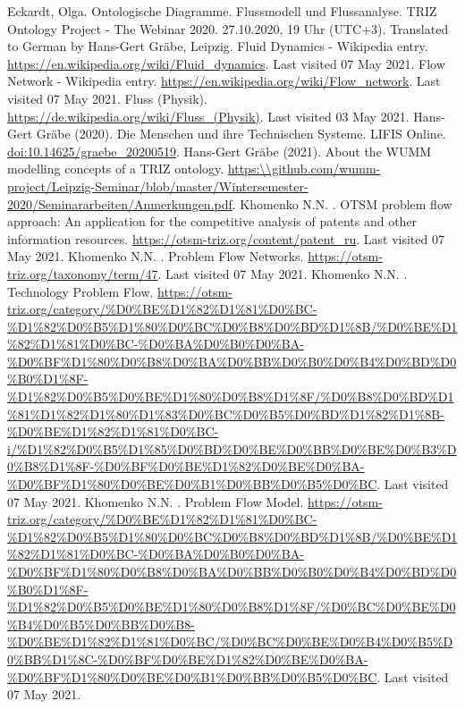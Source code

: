 \documentclass[a4paper,11pt]{article}
\begin{document}
\begin{itemize}
\begin{thebibliography}{...}
    \raggedright
     Eckardt, Olga. Ontologische Diagramme. Flussmodell und Flussanalyse. TRIZ Ontology Project - The Webinar 2020. 27.10.2020, 19 Uhr (UTC+3). Translated to German by Hans-Gert Gräbe, Leipzig. 
     Fluid Dynamics - Wikipedia entry.
        \url{https://en.wikipedia.org/wiki/Fluid_dynamics}. Last visited 07 May 2021.
     Flow Network - Wikipedia entry.
        \url{https://en.wikipedia.org/wiki/Flow_network}. Last visited 07 May 2021.
     Fluss (Physik).
        \url{https://de.wikipedia.org/wiki/Fluss_(Physik)}. Last visited 03 May 2021.
     Hans-Gert Gr\"abe (2020).  Die Menschen und ihre Technischen Systeme. LIFIS Online.
        \url{doi:10.14625/graebe_20200519}.
     Hans-Gert Gr\"abe (2021). About the WUMM modelling concepts of a TRIZ ontology.
        \url{https:\\github.com/wumm-project/Leipzig-Seminar/blob/master/Wintersemester-2020/Seminararbeiten/Anmerkungen.pdf}.
     Khomenko N.N. . OTSM problem flow approach: An application for the competitive analysis of patents and other information resources.
        \url{https://otsm-triz.org/content/patent_ru}. Last visited 07 May 2021.
     Khomenko N.N. . Problem Flow Networks.
        \url{https://otsm-triz.org/taxonomy/term/47}. Last visited 07 May 2021.
     Khomenko N.N. . Technology Problem Flow.
        \url{https://otsm-triz.org/category/%D0%BE%D1%82%D1%81%D0%BC-%D1%82%D0%B5%D1%80%D0%BC%D0%B8%D0%BD%D1%8B/%D0%BE%D1%82%D1%81%D0%BC-%D0%BA%D0%B0%D0%BA-%D0%BF%D1%80%D0%B8%D0%BA%D0%BB%D0%B0%D0%B4%D0%BD%D0%B0%D1%8F-%D1%82%D0%B5%D0%BE%D1%80%D0%B8%D1%8F/%D0%B8%D0%BD%D1%81%D1%82%D1%80%D1%83%D0%BC%D0%B5%D0%BD%D1%82%D1%8B-%D0%BE%D1%82%D1%81%D0%BC-i/%D1%82%D0%B5%D1%85%D0%BD%D0%BE%D0%BB%D0%BE%D0%B3%D0%B8%D1%8F-%D0%BF%D0%BE%D1%82%D0%BE%D0%BA-%D0%BF%D1%80%D0%BE%D0%B1%D0%BB%D0%B5%D0%BC}. Last visited 07 May 2021.
     Khomenko N.N. . Problem Flow Model.
        \url{https://otsm-triz.org/category/%D0%BE%D1%82%D1%81%D0%BC-%D1%82%D0%B5%D1%80%D0%BC%D0%B8%D0%BD%D1%8B/%D0%BE%D1%82%D1%81%D0%BC-%D0%BA%D0%B0%D0%BA-%D0%BF%D1%80%D0%B8%D0%BA%D0%BB%D0%B0%D0%B4%D0%BD%D0%B0%D1%8F-%D1%82%D0%B5%D0%BE%D1%80%D0%B8%D1%8F/%D0%BC%D0%BE%D0%B4%D0%B5%D0%BB%D0%B8-%D0%BE%D1%82%D1%81%D0%BC/%D0%BC%D0%BE%D0%B4%D0%B5%D0%BB%D1%8C-%D0%BF%D0%BE%D1%82%D0%BE%D0%BA-%D0%BF%D1%80%D0%BE%D0%B1%D0%BB%D0%B5%D0%BC}. Last visited 07 May 2021.

\end{thebibliography}
\end{itemize}
\end{document}
